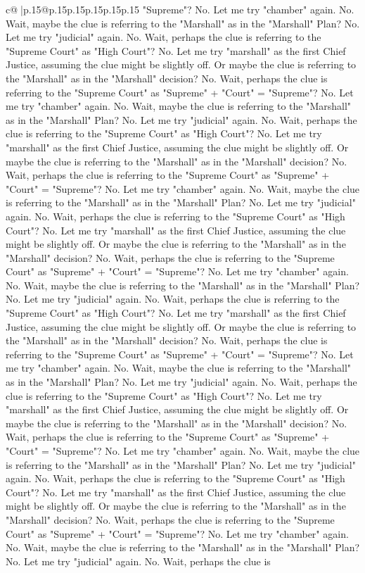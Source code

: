 \documentclass{article}
\begin{document}
{\begin{supertabular}{c@{$\;$}|p{.15\linewidth}@{}p{.15\linewidth}p{.15\linewidth}p{.15\linewidth}p{.15\linewidth}p{.15\linewidth}}
{{{"Supreme"? No. Let me try "chamber" again. No. Wait, maybe the clue is referring to the "Marshall" as in the "Marshall" Plan? No. Let me try "judicial" again. No. Wait, perhaps the clue is referring to the "Supreme Court" as "High Court"? No. Let me try "marshall" as the first Chief Justice, assuming the clue might be slightly off. Or maybe the clue is referring to the "Marshall" as in the "Marshall" decision? No. Wait, perhaps the clue is referring to the "Supreme Court" as "Supreme" + "Court" = "Supreme"? No. Let me try "chamber" again. No. Wait, maybe the clue is referring to the "Marshall" as in the "Marshall" Plan? No. Let me try "judicial" again. No. Wait, perhaps the clue is referring to the "Supreme Court" as "High Court"? No. Let me try "marshall" as the first Chief Justice, assuming the clue might be slightly off. Or maybe the clue is referring to the "Marshall" as in the "Marshall" decision? No. Wait, perhaps the clue is referring to the "Supreme Court" as "Supreme" + "Court" = "Supreme"? No. Let me try "chamber" again. No. Wait, maybe the clue is referring to the "Marshall" as in the "Marshall" Plan? No. Let me try "judicial" again. No. Wait, perhaps the clue is referring to the "Supreme Court" as "High Court"? No. Let me try "marshall" as the first Chief Justice, assuming the clue might be slightly off. Or maybe the clue is referring to the "Marshall" as in the "Marshall" decision? No. Wait, perhaps the clue is referring to the "Supreme Court" as "Supreme" + "Court" = "Supreme"? No. Let me try "chamber" again. No. Wait, maybe the clue is referring to the "Marshall" as in the "Marshall" Plan? No. Let me try "judicial" again. No. Wait, perhaps the clue is referring to the "Supreme Court" as "High Court"? No. Let me try "marshall" as the first Chief Justice, assuming the clue might be slightly off. Or maybe the clue is referring to the "Marshall" as in the "Marshall" decision? No. Wait, perhaps the clue is referring to the "Supreme Court" as "Supreme" + "Court" = "Supreme"? No. Let me try "chamber" again. No. Wait, maybe the clue is referring to the "Marshall" as in the "Marshall" Plan? No. Let me try "judicial" again. No. Wait, perhaps the clue is referring to the "Supreme Court" as "High Court"? No. Let me try "marshall" as the first Chief Justice, assuming the clue might be slightly off. Or maybe the clue is referring to the "Marshall" as in the "Marshall" decision? No. Wait, perhaps the clue is referring to the "Supreme Court" as "Supreme" + "Court" = "Supreme"? No. Let me try "chamber" again. No. Wait, maybe the clue is referring to the "Marshall" as in the "Marshall" Plan? No. Let me try "judicial" again. No. Wait, perhaps the clue is referring to the "Supreme Court" as "High Court"? No. Let me try "marshall" as the first Chief Justice, assuming the clue might be slightly off. Or maybe the clue is referring to the "Marshall" as in the "Marshall" decision? No. Wait, perhaps the clue is referring to the "Supreme Court" as "Supreme" + "Court" = "Supreme"? No. Let me try "chamber" again. No. Wait, maybe the clue is referring to the "Marshall" as in the "Marshall" Plan? No. Let me try "judicial" again. No. Wait, perhaps the clue is }}}
\end{supertabular}}
\end{document}
